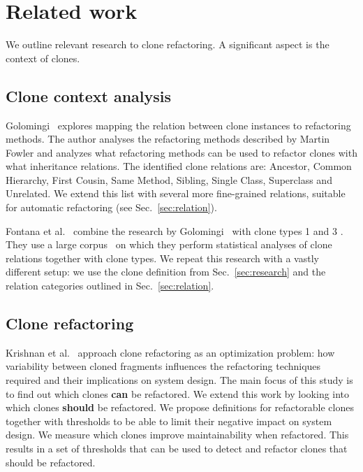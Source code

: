 \documentclass[sigconf,review,anonymous]{acmart}
\begin{document}
\section{Related work}\label{sec:relatedwork}
We outline relevant research to clone refactoring. A significant aspect is the context of clones.

\subsection{Clone context analysis}\label{sec:rw:contextanalysis}
Golomingi~\cite{koni2001scenario} explores mapping the relation between clone instances to refactoring methods. The author analyses the refactoring methods described by Martin Fowler \cite{fowler1999refactoring} and analyzes what refactoring methods can be used to refactor clones with what inheritance relations. The identified clone relations are: Ancestor, Common Hierarchy, First Cousin, Same Method, Sibling, Single Class, Superclass and Unrelated. We extend this list with several more fine-grained relations, suitable for automatic refactoring (see Sec.~\ref{sec:relation}).

Fontana et al.~\cite{fontana2012duplicated, fontana2015duplicated} combine the research by Golomingi~\cite{koni2001scenario} with clone types 1 and 3 \cite{roy2007survey}. They use a large corpus~\cite{tempero2010qualitas} on which they perform statistical analyses of clone relations together with clone types. We repeat this research with a vastly different setup: we use the clone definition from Sec.~\ref{sec:research} and the relation categories outlined in Sec.~\ref{sec:relation}.

\subsection{Clone refactoring}
Krishnan et al.~\cite{krishnan2013refactoring} approach clone refactoring as an optimization problem: how variability between cloned fragments influences the refactoring techniques required and their implications on system design. The main focus of this study is to find out which clones \textbf{can} be refactored. We extend this work by looking into which clones \textbf{should} be refactored. We propose definitions for refactorable clones together with thresholds to be able to limit their negative impact on system design. We measure which clones improve maintainability when refactored. This results in a set of thresholds that can be used to detect and refactor clones that should be refactored.
\end{document}
